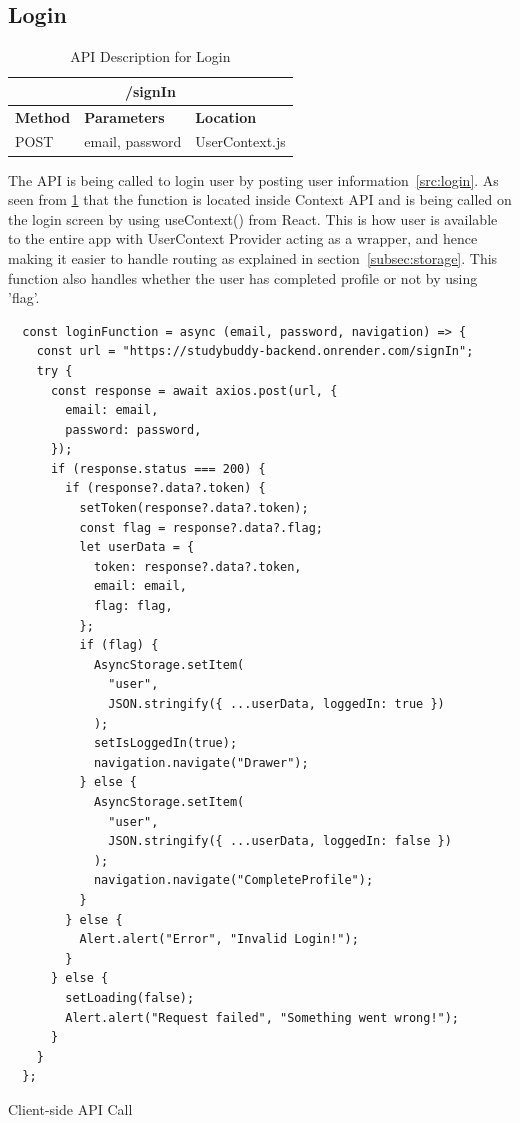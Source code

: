 \subsection{Login}
\begin{table}[H]
	\centering
	\begin{tabular}{ |p{}|p{}|p{}| }
		\hline
            \multicolumn{3}{|c|}{/signIn} \\
            \hline
		\textbf{Method} & \textbf{Parameters} & \textbf{Location}\\
            \hline
		  POST & email, password & UserContext.js\\
            \hline
	\end{tabular}
	\caption{API Description for Login}
	\label{tab:login}
\end{table}
The API is being called to login user by posting user information~\ref{src:login}. As seen from \ref{tab:login} that the function is located inside Context API and is being called on the login screen by using useContext() from React. This is how user is available to the entire app with UserContext Provider acting as a wrapper, and hence making it easier to handle routing as explained in section~\ref{subsec:storage}. This function also handles whether the user has completed profile or not by using 'flag'.
\begin{listing}[H]
\begin{verbatim} 
  const loginFunction = async (email, password, navigation) => {
    const url = "https://studybuddy-backend.onrender.com/signIn";
    try {
      const response = await axios.post(url, {
        email: email,
        password: password,
      });
      if (response.status === 200) {
        if (response?.data?.token) {
          setToken(response?.data?.token);
          const flag = response?.data?.flag;
          let userData = {
            token: response?.data?.token,
            email: email,
            flag: flag,
          };
          if (flag) {
            AsyncStorage.setItem(
              "user",
              JSON.stringify({ ...userData, loggedIn: true })
            );
            setIsLoggedIn(true);
            navigation.navigate("Drawer");
          } else {
            AsyncStorage.setItem(
              "user",
              JSON.stringify({ ...userData, loggedIn: false })
            );
            navigation.navigate("CompleteProfile");
          }
        } else {
          Alert.alert("Error", "Invalid Login!");
        }
      } else {
        setLoading(false);
        Alert.alert("Request failed", "Something went wrong!");
      }
    } 
  };
\end{verbatim}
\caption{Client-side API Call}
\label{src:login}
\end{listing}
